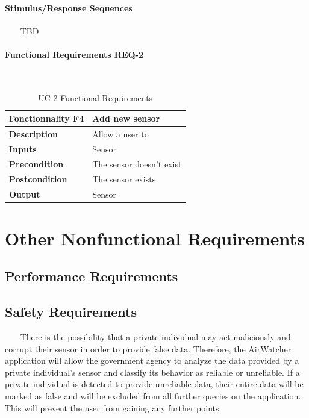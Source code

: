 \documentclass{report}
\begin{document}
\subsubsection*{Stimulus/Response Sequences} ~~~
TBD

\subsubsection*{Functional Requirements REQ-2} ~~~
\begin{table}[H]
	\begin{center}
		\begin{tabular}{|m{4cm}|m{10cm}|}
		\hline
		\textbf{Fonctionnality F4} & Add new sensor \\
		\hline
		\textbf{Description} & Allow a user to  \\
		\hline
		\textbf{Inputs} & Sensor \\
		\hline
		\textbf{Precondition} & The sensor doesn't exist  \\
		\hline
		\textbf{Postcondition} & The sensor exists \\
		\hline
		\textbf{Output} & Sensor \\
		\hline
		\end{tabular}
	\end{center}
	\caption{UC-2 Functional Requirements}
	\label{table:REQ-2}
\end{table}

\chapter{Other Nonfunctional Requirements}

\section{Performance Requirements}

\section{Safety Requirements} ~~~
There is the possibility that a private individual may act maliciously and corrupt their sensor in order
to provide false data. Therefore, the AirWatcher application will allow the government agency to
analyze the data provided by a private individual’s sensor and classify its behavior as reliable or
unreliable. If a private individual is detected to provide unreliable data, their entire data will be
marked as false and will be excluded from all further queries on the application. This will prevent the
user from gaining any further points.
\end{document}
